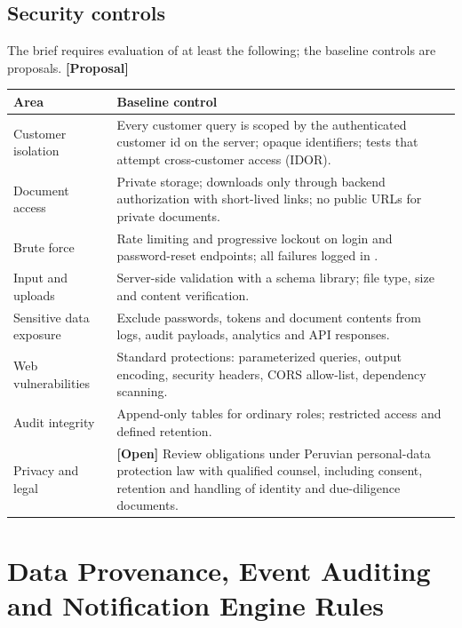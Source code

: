 \documentclass[11pt,a4paper]{article}
\newcommand{\code}[1]{\texttt{\detokenize{#1}}}
\newcommand{\tagprop}{\textcolor{orange!80!black}{\textbf{[Proposal]}}}
\newcommand{\tagopen}{\textcolor{red!70!black}{\textbf{[Open]}}}
\begin{document}
\subsection{Security controls}

The brief requires evaluation of at least the following; the baseline controls
are proposals. \tagprop{}

\begin{longtable}{@{}L{4.2cm}L{11.6cm}@{}}
	\toprule
	\textbf{Area}           & \textbf{Baseline control}
	\\
	\midrule
	\endhead
	Customer isolation      & Every customer query is scoped by the authenticated
	customer id on the server; opaque identifiers; tests that attempt
	cross-customer
	access (IDOR).
	\\
	Document access         & Private storage; downloads only through backend
	authorization with short-lived links; no public URLs for private documents.
	\\
	Brute force             & Rate limiting and progressive lockout on login and
	password-reset endpoints; all failures logged in \code{AccessLogs}.
	\\
	Input and uploads       & Server-side validation with a schema library; file
	type, size and content verification.
	\\
	Sensitive data exposure & Exclude passwords, tokens and document contents from
	logs, audit payloads, analytics and API responses.
	\\
	Web vulnerabilities     & Standard protections: parameterized queries, output
	encoding, security headers, CORS allow-list, dependency scanning.
	\\
	Audit integrity         & Append-only tables for ordinary roles; restricted
	access and
	defined retention.
	\\
	Privacy and legal       & \tagopen{} Review obligations under Peruvian
	personal-data protection law with qualified counsel, including consent,
	retention and handling of identity and due-diligence documents.
	\\
	\bottomrule
\end{longtable}

\section{Data Provenance, Event Auditing and Notification Engine Rules}
\end{document}

